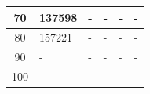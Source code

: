 \begin{table}[H]
\begin{tabular}{|c|l|l|l|l|l|}
70                                                                         & 137598                               & -                                     & -                                     & -                                     & -                                     \\ \hline
80                                                                         & 157221                               & -                                     & -                                     & -                                     & -                                     \\ \hline
90                                                                         & -                                    & -                                     & -                                     & -                                     & -                                     \\ \hline
100                                                                        & -                                    & -                                     & -                                     & -                                     & -                                     \\ \hline
\end{tabular}
\end{table}


